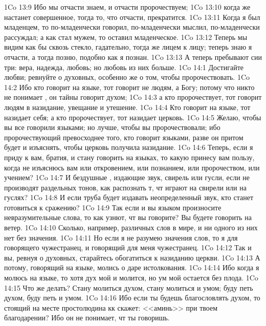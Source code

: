 \vs 1Co 13:9 Ибо мы отчасти знаем, и отчасти пророчествуем;
\vs 1Co 13:10 когда же настанет совершенное, тогда то, что отчасти, прекратится.
\vs 1Co 13:11 Когда я был младенцем, то по-младенчески говорил, по-младенчески мыслил, по-младенчески рассуждал; а как стал мужем, то оставил младенческое.
\vs 1Co 13:12 Теперь мы видим как бы сквозь  стекло, гадательно, тогда же лицем к лицу; теперь знаю я отчасти, а тогда позню, подобно как я познан.
\vs 1Co 13:13 А теперь пребывают сии три: вера, надежда, любовь; но любовь из них больше.
\vs 1Co 14:1 Достигайте любви; ревнуйте о  духовных, особенно же о том, чтобы пророчествовать.
\vs 1Co 14:2 Ибо кто говорит на  языке, тот говорит не людям, а Богу; потому что никто не понимает , он тайны говорит духом;
\vs 1Co 14:3 а кто пророчествует, тот говорит людям в назидание, увещание и утешение.
\vs 1Co 14:4 Кто говорит на  языке, тот назидает себя; а кто пророчествует, тот назидает церковь.
\vs 1Co 14:5 Желаю, чтобы вы все говорили языками; но лучше, чтобы вы пророчествовали; ибо пророчествующий превосходнее того, кто говорит языками, разве он притом будет и изъяснять, чтобы церковь получила назидание.
\vs 1Co 14:6 Теперь, если я приду к вам, братия, и стану говорить на  языках, то какую принесу вам пользу, когда не изъяснюсь вам или откровением, или познанием, или пророчеством, или учением?
\vs 1Co 14:7 И бездушные , издающие звук, свирель или гусли, если не производят раздельных тонов, как распознать т, чт играют на свирели или на гуслях?
\vs 1Co 14:8 И если труба будет издавать неопределенный звук, кто станет готовиться к сражению?
\vs 1Co 14:9 Так если и вы языком произносите невразумительные слова, то как узнют, чт вы говорите? Вы будете говорить на ветер.
\vs 1Co 14:10 Сколько, например, различных слов в мире, и ни одного из них нет без значения.
\vs 1Co 14:11 Но если я не разумею значения слов, то я для говорящего чужестранец, и говорящий для меня чужестранец.
\vs 1Co 14:12 Так и вы, ревнуя о  духовных, старайтесь обогатиться  к назиданию церкви.
\vs 1Co 14:13 А потому, говорящий на  языке, молись о даре истолкования.
\vs 1Co 14:14 Ибо когда я молюсь на  языке, то хотя дух мой и молится, но ум мой остается без плода.
\vs 1Co 14:15 Что же делать? Стану молиться духом, стану молиться и умом; буду петь духом, буду петь и умом.
\vs 1Co 14:16 Ибо если ты будешь благословлять духом, то стоящий на месте простолюдина кк скажет: <<аминь>> при твоем благодарении? Ибо он не понимает, чт ты говоришь.
